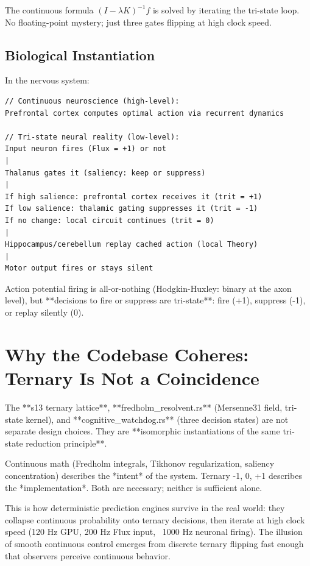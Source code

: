 \documentclass[11pt,oneside]{article}
\theoremstyle{definition}
\begin{document}
The continuous formula $(I - \lambda K)^{-1} f$ is solved by iterating the tri-state loop. No floating-point mystery; just three gates flipping at high clock speed.

\subsection{Biological Instantiation}

In the nervous system:

\begin{lstlisting}
// Continuous neuroscience (high-level):
Prefrontal cortex computes optimal action via recurrent dynamics

// Tri-state neural reality (low-level):
Input neuron fires (Flux = +1) or not
|
Thalamus gates it (saliency: keep or suppress)
|
If high salience: prefrontal cortex receives it (trit = +1)
If low salience: thalamic gating suppresses it (trit = -1)
If no change: local circuit continues (trit = 0)
|
Hippocampus/cerebellum replay cached action (local Theory)
|
Motor output fires or stays silent
\end{lstlisting}

Action potential firing is all-or-nothing (Hodgkin-Huxley: binary at the axon level), but **decisions to fire or suppress are tri-state**: fire (+1), suppress (-1), or replay silently (0).

\section{Why the Codebase Coheres: Ternary Is Not a Coincidence}

The **s13 ternary lattice**, **fredholm\_resolvent.rs** (Mersenne31 field, tri-state kernel), and **cognitive\_watchdog.rs** (three decision states) are not separate design choices. They are **isomorphic instantiations of the same tri-state reduction principle**.

Continuous math (Fredholm integrals, Tikhonov regularization, saliency concentration) describes the *intent* of the system. Ternary {-1, 0, +1} describes the *implementation*. Both are necessary; neither is sufficient alone.

This is how deterministic prediction engines survive in the real world: they collapse continuous probability onto ternary decisions, then iterate at high clock speed (120 Hz GPU, 200 Hz Flux input, ~1000 Hz neuronal firing). The illusion of smooth continuous control emerges from discrete ternary flipping fast enough that observers perceive continuous behavior.
\end{document}
